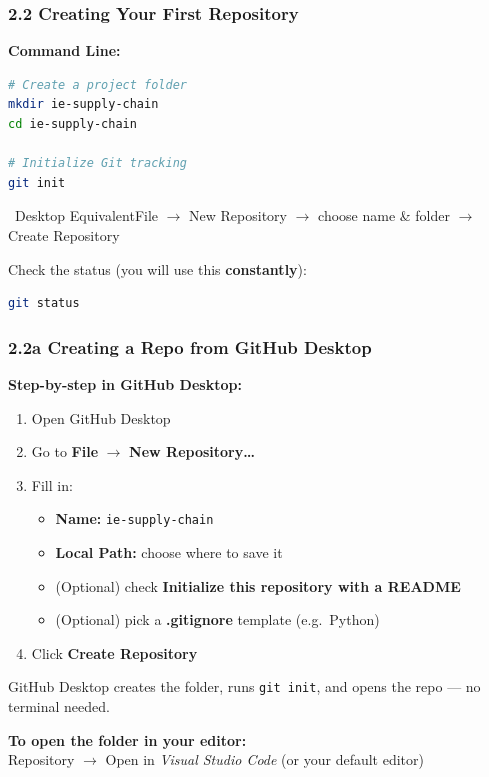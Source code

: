 \documentclass{beamer}
\newcommand{\desktoptip}[1]{\begin{block}{\faMousePointer\ Desktop Equivalent}#1\end{block}}
\begin{document}
\begin{frame}[fragile]
\frametitle{2.2 Creating Your First Repository}

\textbf{Command Line:}
\begin{lstlisting}[language=bash]
# Create a project folder
mkdir ie-supply-chain
cd ie-supply-chain

# Initialize Git tracking
git init
\end{lstlisting}

\desktoptip{File $\rightarrow$ New Repository $\rightarrow$ choose name \& folder $\rightarrow$ Create Repository}

\vspace{2mm}
Check the status (you will use this \textbf{constantly}):
\begin{lstlisting}[language=bash]
git status
\end{lstlisting}
\end{frame}


\begin{frame}
\frametitle{2.2a Creating a Repo from GitHub Desktop}

\textbf{Step-by-step in GitHub Desktop:}
\begin{enumerate}
    \item Open GitHub Desktop
    \item Go to \textbf{File} $\rightarrow$ \textbf{New Repository\ldots}
    \item Fill in:
    \begin{itemize}
        \item \textbf{Name:} \texttt{ie-supply-chain}
        \item \textbf{Local Path:} choose where to save it
        \item (Optional) check \textbf{Initialize this repository with a README}
        \item (Optional) pick a \textbf{.gitignore} template (e.g.\ Python)
    \end{itemize}
    \item Click \textbf{Create Repository}
\end{enumerate}

\vspace{2mm}
GitHub Desktop creates the folder, runs \texttt{git init}, and opens the repo --- no terminal needed.

\vspace{2mm}
\textbf{To open the folder in your editor:}\\
Repository $\rightarrow$ Open in \textit{Visual Studio Code} (or your default editor)
\end{frame}
\end{document}
